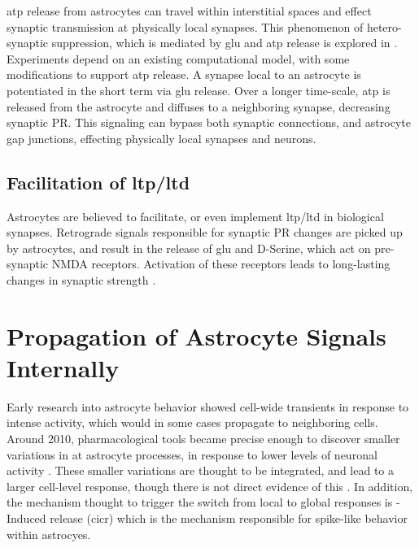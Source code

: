     \Gls{atp} release from astrocytes can travel within interstitial spaces and
    effect synaptic transmission at physically local synapses. This phenomenon
    of hetero-synaptic suppression, which is mediated by \gls{glu} and \gls{atp}
    release is explored in \parencite{postnov_2009}. Experiments depend on an
    existing computational model, with some modifications to support \gls{atp}
    release. A synapse local to an astrocyte is potentiated in the short term
    via \gls{glu} release. Over a longer time-scale, \gls{atp} is released from
    the astrocyte and diffuses to a neighboring synapse, decreasing synaptic
    PR. This signaling can bypass both synaptic connections, and astrocyte gap
    junctions, effecting physically local synapses and neurons.

    \subsection{Facilitation of \Gls{ltp}/\Gls{ltd}}
    Astrocytes are believed to facilitate, or even implement \gls{ltp}/\gls{ltd} in
    biological synapses. Retrograde signals responsible for synaptic PR changes
    are picked up by astrocytes, and result in the release of \gls{glu} and D-Serine,
    which act on pre-synaptic NMDA receptors. Activation of these receptors
    leads to long-lasting changes in synaptic strength \parencite{min_2012}.

    \section{Propagation of Astrocyte Signals Internally}
    Early research into astrocyte behavior showed cell-wide \ca transients in
    response to intense activity, which would in some cases propagate to
    neighboring cells. Around 2010, pharmacological tools became precise enough
    to discover smaller variations in \ca at astrocyte processes, in response to
    lower levels of neuronal activity \parencite{manninen_2018}. These smaller
    variations are thought to be integrated, and lead to a larger cell-level \ca
    response, though there is not direct evidence of this
    \parencite{araque_2014}. In addition, the mechanism thought to trigger the
    switch from local to global responses is \ca-Induced \ca release
    (\gls{cicr}) which is the mechanism responsible for spike-like behavior
    within astrocyes.

